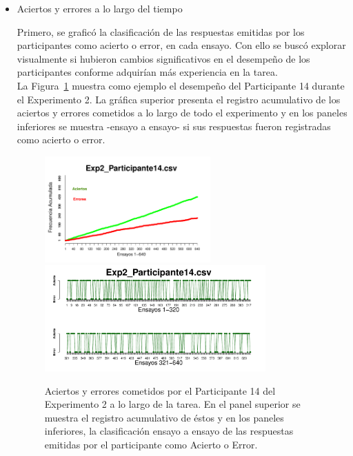 \begin{itemize}
	\item Aciertos y errores a lo largo del tiempo

Primero, se graficó la clasificación de las respuestas emitidas por los participantes como acierto o error, en cada ensayo. Con ello se buscó explorar visualmente si hubieron cambios significativos en el desempeño de los participantes conforme adquirían más experiencia en la tarea.\\

La Figura~\ref{fig:Success_E2_P14} muestra como ejemplo el desempeño del Participante 14 durante el Experimento 2. La gráfica superior presenta el registro acumulativo de los aciertos y errores cometidos a lo largo de todo el experimento y en los paneles inferiores se muestra -ensayo a ensayo- si sus respuestas fueron registradas como acierto o error.\\

\begin{figure}[th]
\centering
\includegraphics[width=0.60\textwidth]{Figures/SuccessCumulative_Exp2_P14} \\
\includegraphics[width=0.80\textwidth]{Figures/Success_Exp2_P14}
\decoRule
\caption[Explorando datos individuales (ejemplo): Aciertos y errores cometidos en cada ensayo]{Aciertos y errores cometidos por el Participante 14 del Experimento 2 a lo largo de la tarea. En el panel superior se muestra el registro acumulativo de éstos y en los paneles inferiores, la clasificación ensayo a ensayo de las respuestas emitidas por el participante como Acierto o Error.}
\label{fig:Success_E2_P14}
\end{figure}


\end{itemize}
